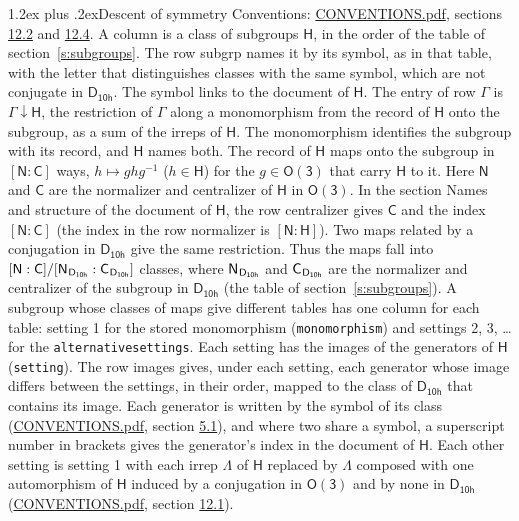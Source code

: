 \documentclass[10pt,a4paper]{article}
\makeatletter
\renewcommand\section{\@startsection{section}{1}{\z@}{-3ex plus -1ex minus -.2ex}%
  {1.2ex plus .2ex}{\normalfont\large\sffamily\bfseries\color{parttitle}}}
\numberwithin{equation}{section}
\newcommand{\grp}[1]{\mathsf{#1}}
\newcommand{\grpindex}[2]{[#1 : #2]}
\newcommand{\restr}[2]{#1\!\downarrow#2}
\newcommand{\hairsp}{\mkern1mu}
\makeatother
\begin{document}
\section{Descent of symmetry}\label{s:subduction}
Conventions: \href{../../CONVENTIONS.pdf}{CONVENTIONS.pdf}, sections \href{../../CONVENTIONS.pdf\#conv.12.2}{12.2} and \href{../../CONVENTIONS.pdf\#conv.12.4}{12.4}.
A column is a class of subgroups $\grp{H}$, in the order of the table of section~\ref{s:subgroups}. The row subgrp names it by its symbol, as in that table, with the letter that distinguishes classes with the same symbol, which are not conjugate in $\grp{D_{10h}}$. The symbol links to the document of $\grp{H}$. The entry of row $\Gamma$ is $\restr{\Gamma}{\grp{H}}$, the restriction of $\Gamma$ along a monomorphism from the record of $\grp{H}$ onto the subgroup, as a sum of the irreps of $\grp{H}$. The monomorphism identifies the subgroup with its record, and $\grp{H}$ names both. \label{n:group.normalizer.o3}\label{n:group.centralizer.o3}The record of $\grp{H}$ maps onto the subgroup in $\grpindex{\grp{N}}{\grp{C}}$ ways, $h \mapsto g h g^{-1}$ ($h \in \grp{H}$) for the $g \in \grp{O(3)}$ that carry $\grp{H}$ to it. Here $\grp{N}$ and $\grp{C}$ are the normalizer and centralizer of $\grp{H}$ in \href{O3.pdf}{$\grp{O(3)}$}. In the section Names and structure of the document of $\grp{H}$, the row centralizer gives $\grp{C}$ and the index $\grpindex{\grp{N}}{\grp{C}}$ (the index in the row normalizer is $\grpindex{\grp{N}}{\grp{H}}$). Two maps related by a conjugation in $\grp{D_{10h}}$ give the same restriction. Thus the maps fall into $\grpindex{\grp{N}}{\grp{C}}/\grpindex{\grp{N}_{\hairsp \grp{D_{10h}}}}{\grp{C}_{\hairsp \grp{D_{10h}}}}$ classes, where $\grp{N}_{\hairsp \grp{D_{10h}}}$ and $\grp{C}_{\hairsp \grp{D_{10h}}}$ are the normalizer and centralizer of the subgroup in $\grp{D_{10h}}$ (the table of section~\ref{s:subgroups}). \label{n:head.setting}A subgroup whose classes of maps give different tables has one column for each table: setting 1 for the stored monomorphism (\texttt{monomorphism}) and settings 2, 3, \dots{} for the \texttt{alternativesettings}. Each setting has the images of the generators of $\grp{H}$ (\texttt{setting}). \label{n:head.images}The row images gives, under each setting, each generator whose image differs between the settings, in their order, mapped to the class of $\grp{D_{10h}}$ that contains its image. \label{n:element.generator.index}Each generator is written by the symbol of its class (\href{../../CONVENTIONS.pdf}{CONVENTIONS.pdf}, section \href{../../CONVENTIONS.pdf\#conv.5.1}{5.1}), and where two share a symbol, a superscript number in brackets gives the generator's index in the document of $\grp{H}$. \label{n:irrep.Delta}Each other setting is setting 1 with each irrep $\Lambda$ of $\grp{H}$ replaced by $\Lambda$ composed with one automorphism of $\grp{H}$ induced by a conjugation in \href{O3.pdf}{$\grp{O(3)}$} and by none in $\grp{D_{10h}}$ (\href{../../CONVENTIONS.pdf}{CONVENTIONS.pdf}, section \href{../../CONVENTIONS.pdf\#conv.12.1}{12.1}).
\end{document}
